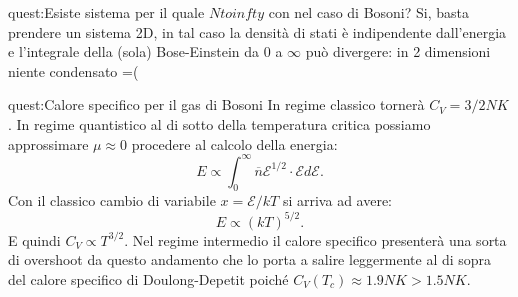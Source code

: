 \begin{quest}{quest:Esiste sistema per il quale $Ntoinfty$ con  nel caso di Bosoni?}
    Si, basta prendere un sistema 2D, in tal caso la densità di stati è indipendente dall'energia e l'integrale della (sola) Bose-Einstein da 0 a $\infty$ può divergere: in 2 dimensioni niente condensato =(
\end{quest}
\begin{quest}{quest:Calore specifico per il gas di Bosoni}
    In regime classico tornerà $C_V = 3 /2 NK$. In regime quantistico al di sotto della temperatura critica possiamo approssimare $\mu\approx  0$ procedere al calcolo della energia:
\[
    E \propto  \int_0^{\infty} \overline{n}\mathcal{E}^{1 /2}\cdot \mathcal{E}  d\mathcal{E}
.\] 
Con il classico cambio di variabile $x = \mathcal{E}  /kT$ si arriva ad avere:
\[
    E \propto  \left(kT\right)^{5 /2}
.\] 
E quindi $C_V \propto T^{3 /2}$. Nel regime intermedio il calore specifico presenterà una sorta di overshoot da questo andamento che lo porta a salire leggermente al di sopra del calore specifico di Doulong-Depetit poiché $C_V(T_c) \approx 1.9 NK > 1.5 NK$.
\end{quest}






